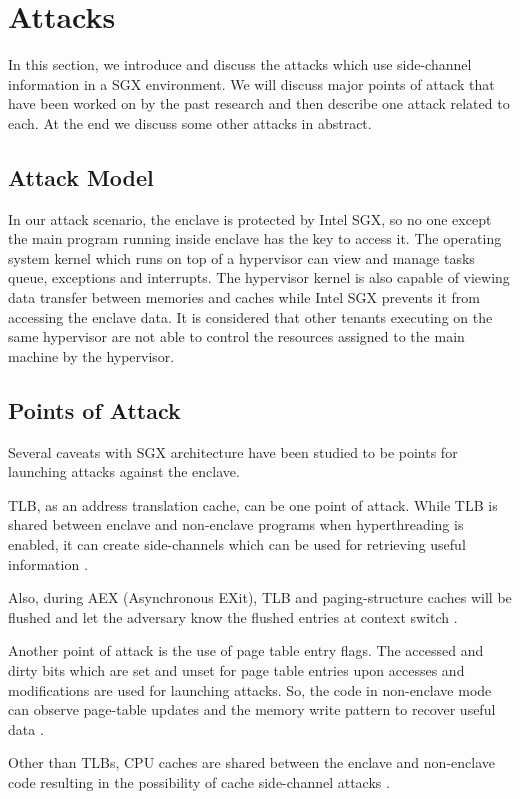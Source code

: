 \section{Attacks}
In this section, we introduce and discuss the attacks which use side-channel information in a SGX environment. We will discuss major points of attack that have been worked on by the past research and then describe one attack related to each. At the end we discuss some other attacks in abstract.

\subsection{Attack Model}
In our attack scenario, the enclave is protected by Intel SGX, so no one except the main program running inside enclave has the key to access it. The operating system kernel which runs on top of a hypervisor can view and manage tasks queue, exceptions and interrupts. The hypervisor kernel is also capable of viewing data transfer between memories and caches while Intel SGX prevents it from accessing the enclave data. It is considered that other tenants executing on the same hypervisor are not able to control the resources assigned to the main machine by the hypervisor.

\subsection{Points of Attack}
Several caveats with SGX architecture have been studied to be points for launching attacks against the enclave.

TLB, as an address translation cache, can be one point of attack. While TLB is shared between enclave and non-enclave programs when hyperthreading is enabled, it can create side-channels which can be used for retrieving useful information \cite{leakycauldron}.

Also, during AEX (Asynchronous EXit), TLB and paging-structure caches will be flushed and let the adversary know the flushed entries at context switch \cite{leakycauldron}.

Another point of attack is the use of page table entry flags. The accessed and dirty bits which are set and unset for page table entries upon accesses and modifications are used for launching attacks. So, the code in non-enclave mode can observe page-table updates and the memory write pattern to recover useful data \cite{leakycauldron,stealthy}.

Other than TLBs, CPU caches are shared between the enclave and non-enclave code resulting in the possibility of cache side-channel attacks \cite{leakycauldron}.

